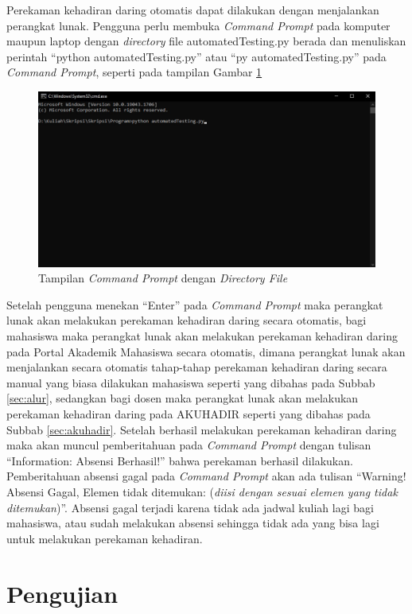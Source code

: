 Perekaman kehadiran daring otomatis dapat dilakukan dengan menjalankan perangkat lunak. Pengguna perlu membuka \textit{Command Prompt} pada komputer maupun laptop dengan \textit{directory} file automatedTesting.py berada dan menuliskan perintah ``python automatedTesting.py'' atau ``py automatedTesting.py'' pada \textit{Command Prompt}, seperti pada tampilan Gambar \ref{fig:cmd}
\begin{figure}[H]
	\centering
	\includegraphics[scale=0.5]{Gambar/cmd.jpg}
	\caption{Tampilan \textit{Command Prompt} dengan \textit{Directory File}} 
	\label{fig:cmd}
\end{figure}

Setelah pengguna menekan ``Enter'' pada \textit{Command Prompt} maka perangkat lunak akan melakukan perekaman kehadiran daring secara otomatis, bagi mahasiswa maka perangkat lunak akan melakukan perekaman kehadiran daring pada Portal Akademik Mahasiswa secara otomatis, dimana perangkat lunak akan menjalankan secara otomatis tahap-tahap perekaman kehadiran daring secara manual yang biasa dilakukan mahasiswa seperti yang dibahas pada Subbab \ref{sec:alur}, sedangkan bagi dosen maka perangkat lunak akan melakukan perekaman kehadiran daring pada AKUHADIR seperti yang dibahas pada Subbab \ref{sec:akuhadir}. Setelah berhasil melakukan perekaman kehadiran daring maka akan muncul pemberitahuan pada \textit{Command Prompt} dengan tulisan ``Information: Absensi Berhasil!'' bahwa perekaman berhasil dilakukan. Pemberitahuan absensi gagal pada \textit{Command Prompt} akan ada tulisan ``Warning! Absensi Gagal, Elemen tidak ditemukan: (\textit{diisi dengan sesuai elemen yang tidak ditemukan})''. Absensi gagal terjadi karena tidak ada jadwal kuliah lagi bagi mahasiswa, atau sudah melakukan absensi sehingga tidak ada yang bisa lagi untuk melakukan perekaman kehadiran.

\section{Pengujian}
\label{sec:pengujian} 

